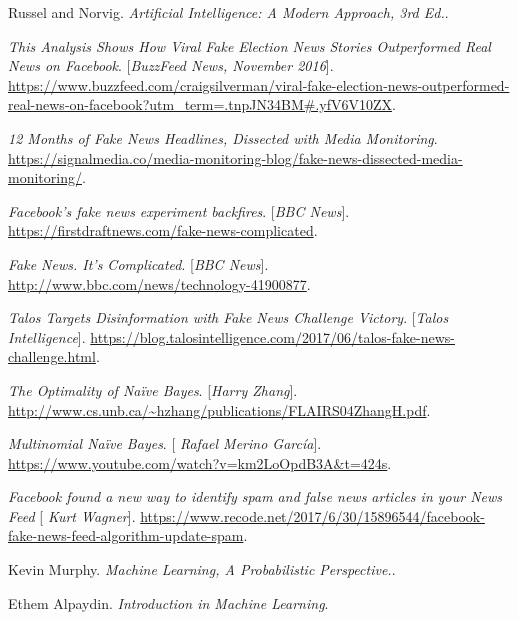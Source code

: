\documentclass{neu_handout}
\begin{document}
\begin{thebibliography}{9}

Russel and Norvig. 
\textit{Artificial Intelligence: A Modern Approach, 3rd Ed.}. 

 
\textit{This Analysis Shows How Viral Fake Election News Stories Outperformed Real News on Facebook}.
[\textit{BuzzFeed News, November 2016}].
\url{https://www.buzzfeed.com/craigsilverman/viral-fake-election-news-outperformed-real-news-on-facebook?utm_term=.tnpJN34BM#.yfV6V10ZX}.
 

\textit{12 Months of Fake News Headlines, Dissected with Media Monitoring}. 
 \url{https://signalmedia.co/media-monitoring-blog/fake-news-dissected-media-monitoring/}.

\textit{Facebook's fake news experiment backfires}.
[\textit{BBC News}]. 
 \url{https://firstdraftnews.com/fake-news-complicated}.
 
 
\textit{Fake News. It's Complicated}.
[\textit{BBC News}]. 
 \url{http://www.bbc.com/news/technology-41900877}.
 
\textit{Talos Targets Disinformation with Fake News Challenge Victory}.
[\textit{Talos Intelligence}]. 
 \url{https://blog.talosintelligence.com/2017/06/talos-fake-news-challenge.html}.
 
\textit{The Optimality of Na\"ive Bayes}.
[\textit{Harry Zhang}]. 
 \url{http://www.cs.unb.ca/~hzhang/publications/FLAIRS04ZhangH.pdf}.
 
 
\textit{Multinomial Na\"ive Bayes}.
[\textit{
Rafael Merino García}]. 
 \url{https://www.youtube.com/watch?v=km2LoOpdB3A&t=424s}.
 
\textit{Facebook found a new way to identify spam and false news articles in your News Feed}
[\textit{
Kurt Wagner}]. 
 \url{https://www.recode.net/2017/6/30/15896544/facebook-fake-news-feed-algorithm-update-spam}.

Kevin Murphy. 
\textit{Machine Learning, A Probabilistic Perspective.}.

Ethem Alpaydin. 
\textit{Introduction in Machine Learning}.

\end{thebibliography}
\end{document}
